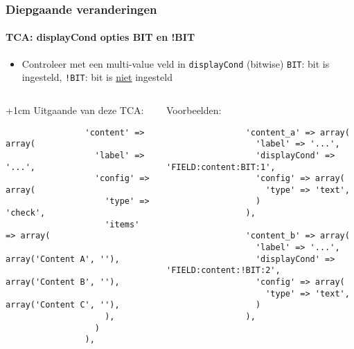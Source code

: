 
\begin{frame}[fragile]
	\frametitle{Diepgaande veranderingen}
	\framesubtitle{TCA: displayCond opties BIT en !BIT}

	\lstset{
		basicstyle=\tiny\ttfamily
	}

	\begin{itemize}
		\item Controleer met een multi-value veld in \texttt{displayCond} (bitwise)\newline
			\texttt{BIT}: bit is ingesteld, \texttt{!BIT}: bit is \underline{niet} ingesteld
	\end{itemize}

	\begin{columns}[T]

		\begin{column}{.5\textwidth}

			\advance\leftskip+1cm
			Uitgaande van deze TCA:

			\lstset{xleftmargin=1cm}

			\begin{lstlisting}
				'content' => array(
				  'label' => '...',
				  'config' => array(
				    'type' => 'check',
				    'items' => array(
				      array('Content A', ''),
				      array('Content B', ''),
				      array('Content C', ''),
				    ),
				  )
				),
			\end{lstlisting}

		\end{column}
		\begin{column}{.5\textwidth}

			Voorbeelden:

			\begin{lstlisting}
				'content_a' => array(
				  'label' => '...',
				  'displayCond' => 'FIELD:content:BIT:1',
				  'config' => array(
				    'type' => 'text',
				  )
				),

				'content_b' => array(
				  'label' => '...',
				  'displayCond' => 'FIELD:content:!BIT:2',
				  'config' => array(
				    'type' => 'text',
				  )
				),
			\end{lstlisting}
		\end{column}

	\end{columns}

\end{frame}

